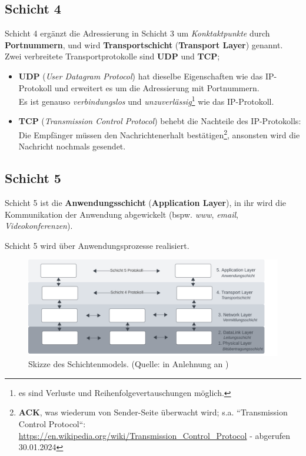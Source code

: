 \subsection*{Schicht 4}
Schicht 4 ergänzt die Adressierung in Schicht 3 um \textit{Konktaktpunkte} durch \textbf{Portnummern}, und wird \textbf{Transportschicht} (\textbf{Transport Layer}) genannt.\\

\noindent
Zwei verbreitete Transportprotokolle sind \textbf{UDP} und \textbf{TCP};

\begin{itemize}
    \item \textbf{UDP} (\textit{User Datagram Protocol}) hat dieselbe Eigenschaften wie das IP-Protokoll und erweitert es um die Adressierung mit Portnummern.\\
    Es ist genauso   \textit{verbindungslos} und \textit{unzuverlässig}\footnote{
    es sind Verluste und Reihenfolgevertauschungen möglich.
    } wie das IP-Protokoll.
    \item \textbf{TCP} (\textit{Transmission Control Protocol}) behebt die Nachteile des IP-Protokolls: Die Empfänger müssen den Nachrichtenerhalt bestätigen\footnote{ \textbf{ACK},
    was wiederum von Sender-Seite überwacht wird; s.a. ``Transmission Control Protocol``: \url{https://en.wikipedia.org/wiki/Transmission_Control_Protocol} - abgerufen 30.01.2024
    }, ansonsten wird die Nachricht nochmals gesendet.
\end{itemize}


\subsection*{Schicht 5}
Schicht 5 ist die \textbf{Anwendungsschicht} (\textbf{Application Layer}), in ihr wird die Kommunikation der Anwendung abgewickelt (bspw. \textit{www}, \textit{email}, \textit{Videokonferenzen}).


\begin{tcolorbox}
    Schicht 5 wird über Anwendungsprozesse realisiert.
\end{tcolorbox}


\begin{figure}
    \centering
    \includegraphics[width=16cm]{chapters/fopt5/img/layers}
    \caption{Skizze des Schichtenmodels. (Quelle: in Anlehnung an \cite[257, Bild 5.2]{Oec22})}
    \label{fig:layers}
\end{figure}


